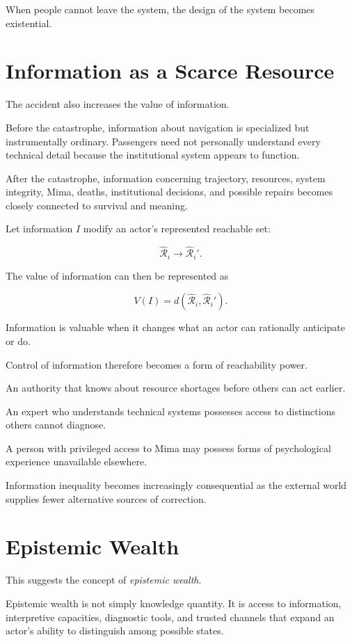 \documentclass[11pt,oneside]{book}
\theoremstyle{definition}
\theoremstyle{remark}
\newcommand{\R}{\mathcal{R}}
\begin{document}
When people cannot leave the system, the design of the system becomes existential.

\section{Information as a Scarce Resource}

The accident also increases the value of information.

Before the catastrophe, information about navigation is specialized but instrumentally ordinary. Passengers need not personally understand every technical detail because the institutional system appears to function.

After the catastrophe, information concerning trajectory, resources, system integrity, Mima, deaths, institutional decisions, and possible repairs becomes closely connected to survival and meaning.

Let information \(I\) modify an actor's represented reachable set:

\[
\widehat{\R}_i
\rightarrow
\widehat{\R}_i'.
\]

The value of information can then be represented as

\[
V(I)
=
d(
\widehat{\R}_i,
\widehat{\R}_i'
).
\]

Information is valuable when it changes what an actor can rationally anticipate or do.

Control of information therefore becomes a form of reachability power.

An authority that knows about resource shortages before others can act earlier.

An expert who understands technical systems possesses access to distinctions others cannot diagnose.

A person with privileged access to Mima may possess forms of psychological experience unavailable elsewhere.

Information inequality becomes increasingly consequential as the external world supplies fewer alternative sources of correction.

\section{Epistemic Wealth}

This suggests the concept of \emph{epistemic wealth}.

Epistemic wealth is not simply knowledge quantity. It is access to information, interpretive capacities, diagnostic tools, and trusted channels that expand an actor's ability to distinguish among possible states.
\end{document}

